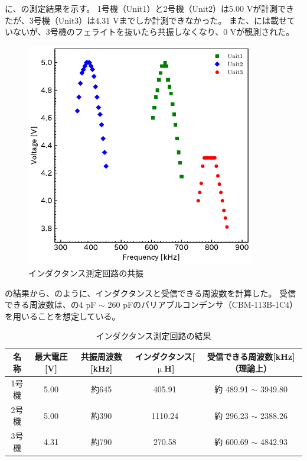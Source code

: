 \documentclass[report.tex]{subfiles}
\begin{document}
に、の測定結果を示す。
1号機（Unit1）と2号機（Unit2）は5.00 Vが計測できたが、3号機（Unit3）は4.31 Vまでしか計測できなかった。
また、には載せていないが、3号機のフェライトを抜いたら共振しなくなり、0 Vが観測された。

\begin{figure}[H]
	\centering
	\includegraphics[width=10cm]{fig/inda_inda.pdf}
	\caption{インダクタンス測定回路の共振}
	\label{fig:inda2}
\end{figure}

の結果から、のように、インダクタンスと受信できる周波数を計算した。
受信できる周波数は、の4 pF \(\sim\) 260 pFのバリアブルコンデンサ（CBM-113B-1C4）を用いることを想定している。

\begin{table}[H]
	\centering
	\caption{インダクタンス測定回路の結果}
	\label{tab:ant2}
	\begin{tabular}{ccccc} \hline
		名称  & 最大電圧[V] & 共振周波数[kHz] & インダクタンス[\(\upmu\)H] & 受信できる周波数[kHz]（理論上）        \\ \hline
		1号機 & 5.00    & 約645       & 405.91              & 約 489.91 \(\sim\) 3949.80 \\
		2号機 & 5.00    & 約390       & 1110.24             & 約 296.23 \(\sim\) 2388.26 \\
		3号機 & 4.31    & 約790       & 270.58              & 約 600.69 \(\sim\) 4842.93 \\ \hline
	\end{tabular}
\end{table}
\end{document}
